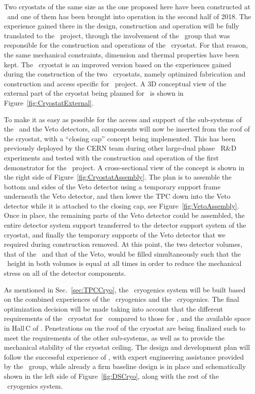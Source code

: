 Two cryostats of the same size as the one proposed here have been constructed at \CERN\ and one of them has been brought into operation in the second half of 2018. The experience gained there in the design, construction and operation will be fully translated to the \DSks\ project, through the involvement of the \CERN\ group that was responsible for the construction and operations of the \pDUNE\ cryostat. For that reason, the same mechanical constraints, dimension and thermal properties have been kept. The  \DSks\ cryostat is an improved version based on the experiences gained during the construction of the two \pDUNE\ cryostats, namely optimized fabrication and construction and access specific for \DSks\ project. A 3D conceptual view of the external part of the cryostat being planned for \DSks\ is shown in Figure~\ref{fig:CryostatExternal}. 

To make it as easy as possible for the access and support of the sub-systems of the \TPC\ and the Veto detectors, all components will now be inserted from the roof of the cryostat, with a ``closing cap'' concept being implemented. This has been previously deployed by the CERN team during other large-dual phase \TPC\ R\&D experiments and tested with the construction and operation of the first demonstrator for the \pDUNE\ project.  A cross-sectional view of the concept is shown in the right side of Figure~\ref{fig:CryostatAssembly}.  The plan is to assemble the bottom and sides of the Veto detector using a temporary support frame underneath the Veto detector, and then lower the TPC down into the Veto detector while it is attached to the closing cap, see Figure~\ref{fig:VetoAssembly}.  Once in place, the remaining parts of the Veto detector could be assembled, the entire detector system support transferred to the detector support system of the cryostat, and finally the temporary supports of the Veto detector that we required during construction removed.  At this point, the two detector volumes, that of the \TPC\ and that of the Veto, would be filled simultaneously such that the \LAr\ height in both volumes is equal at all times in order to reduce the mechanical stress on all of the detector components.

As mentioned in Sec.~\ref{sec:TPCCryo}, the \AAr\ cryogenics system will be built based on the combined experiences of the  \pDUNE\  cryogenics and the \DSfs\ cryogenics. The final optimization decision will be made taking into account that the different requirements of the \AAr\ cryostat for \DSks\ compared to those for \pDUNE, and the available space in Hall\,C of \LNGS. Penetrations on the roof of the cryostat are being finalized such to meet the requirements of the other sub-systems, as well as to provide the mechanical stability of the cryostat ceiling. The design and development plan will follow the successful experience of \pDUNE, with expert engineering assistance provided by the \CERN\ group, while already a firm baseline design is in place and schematically shown in the left side of Figure~\ref{fig:DSCryo}, along with the rest of the \DSks\ cryogenics system.